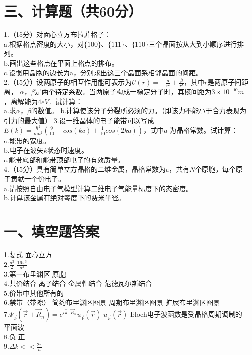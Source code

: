 \documentclass[UTF8]{ctexart}
\begin{document}
\section*{\bfseries 三、计算题（共60分）}
1.（15分）对面心立方布拉菲格子：\\
a.根据格点密度的大小，对$\{100\}$、$\{111\}$、$\{110\}$三个晶面按从大到小顺序进行排列。\\
b.画出这些格点在平面上格点的排布。\\
c.设惯用晶胞的边长为a，分别求出这三个晶面系相邻晶面的间距。\\
2.（15分）设两原子的相互作用能可表示为$U(r)=-\frac{\alpha}{r^2}+\frac{\beta}{r^8}$，其中$r$是两原子间距离，
$\alpha$，$\beta$是两个待定系数。当两原子构成一稳定分子时，其核间距为$3\times10^{-10}m$，离解能为$4eV$，试计算：\\
a.求$\alpha$，$\beta$的数值。
b.计算使该分子分裂所必须的力。（即该力不能小于合力表现为引力的最大值）
3.设一维晶体的电子能带可以写成$E(k)=\frac{\hbar^2}{ma^2}(\frac{9}{10}-cos(ka)+\frac{1}{10}cos(2ka))$，式中$a$
为晶格常数。试计算：\\
a.能带的宽度。\\
b.电子在波矢$k$状态时速度。\\
c.能带底部和能带顶部电子的有效质量。\\
4.（15分）具有简单立方晶格的二维金属，晶格常数为$a$，共有$N$个原胞，每个原子贡献一个价电子。\\
a.请按照自由电子气模型计算二维电子气能量标度下的态密度。\\
b.计算该金属在绝对零度下的费米半径。\\





\newpage
\section*{\bfseries 一、填空题答案}
1.复式\makebox[2em]{}
面心立方\\
2.$\frac{a^3}{2}$\makebox[2em]{}
$\frac{16\pi^3}{a^3}$\\
3.第一布里渊区\makebox[2em]{}
原胞\\
4.共价结合\makebox[2em]{}
离子结合\makebox[2em]{}
金属性结合\makebox[2em]{}
范德瓦尔斯结合\\
5.价带中其他所有的\\
6.禁带（带隙）\makebox[2em]{}
简约布里渊区图景\makebox[2em]{}
周期布里渊区图景\makebox[2em]{}
扩展布里渊区图景\\
7.$\Psi_{\vec k}(\vec r+\vec R_n)=e^{i\vec k\cdot\vec R_n}u_{\vec k}(\vec r)$\makebox[2em]{}
$u_{\vec k}(\vec r)$\makebox[2em]{}
Bloch电子波函数是受晶格周期调制的平面波\\
8.负\makebox[2em]{}
正\\
9.$\Delta k<<\frac{2\pi}{a}$\\
\end{document}
